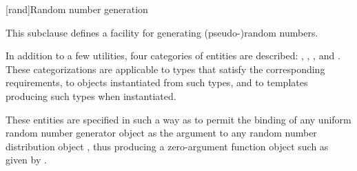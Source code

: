 

[rand]{Random number generation}

%
%
%
%

\pnum
This subclause defines a facility
for generating (pseudo-)random numbers.

\pnum
In addition to a few utilities,
four categories of entities are described:
,
,
,
and
.
These categorizations are applicable
to types that satisfy the corresponding requirements,
to objects instantiated from such types,
and to templates producing such types when instantiated.
\begin{note}
 These entities are specified in such a way
 as to permit the binding
 of any uniform random number generator object 
 as the argument
 to any random number distribution object ,
 thus producing a zero-argument function object
 such as given by
 .
\end{note}

